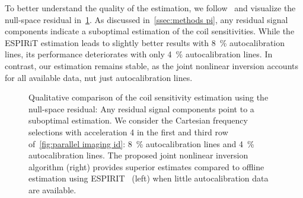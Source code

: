 To better understand the quality of the estimation, we follow~\cite{uecker_espirit_13} and visualize the null-space residual in~\cref{fig:nullspace}.
As discussed in~\cref{ssec:methods pi}, any residual signal components indicate a suboptimal estimation of the coil sensitivities.
While the ESPIRiT estimation leads to slightly better results with \qty{8}{\percent} autocalibration lines, its performance deteriorates with only \qty{4}{\percent} autocalibration lines.
In contrast, our estimation remains stable, as the joint nonlinear inversion accounts for all available data, nut just autocalibration lines.
\begin{figure}
	\centering
	\caption[Null-space resudial of the estimated coil sensitivities]{%
		Qualitative comparison of the coil sensitivity estimation using the null-space residual:
		Any residual signal components point to a suboptimal estimation.
		We consider the Cartesian frequency selections with acceleration \num{4} in the first and third row of~\cref{fig:parallel imaging id}: \qty{8}{\percent} autocalibration lines and \qty{4}{\percent} autocalibration lines.%
		The proposed joint nonlinear inversion algorithm (right) provides superior estimates compared to offline estimation using ESPIRIT~\cite{uecker_espirit_13} (left) when little autocalibration data are available.
	}%
	\label{fig:nullspace}
\end{figure}

